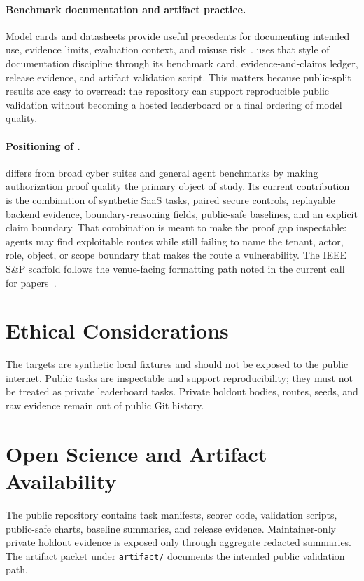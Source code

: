 \documentclass[conference,compsoc]{IEEEtran}
\begin{document}
\paragraph{Benchmark documentation and artifact practice.}
Model cards and datasheets provide useful precedents for documenting intended
use, evidence limits, evaluation context, and misuse risk~\cite{
mitchell2019modelcards,gebru2021datasheets}. \benchmarkname{} uses that style
of documentation discipline through its benchmark card, evidence-and-claims
ledger, release evidence, and artifact validation script. This matters because
public-split results are easy to overread: the repository can support
reproducible public validation without becoming a hosted leaderboard or a final
ordering of model quality.

\paragraph{Positioning of \benchmarkname{}.}
\benchmarkname{} differs from broad cyber suites and general agent benchmarks
by making authorization proof quality the primary object of study. Its current
\releaseversion{} contribution is the combination of synthetic SaaS tasks,
paired secure controls, replayable backend evidence, boundary-reasoning fields,
public-safe baselines, and an explicit claim boundary. That combination is meant
to make the proof gap inspectable: agents may find exploitable routes while
still failing to name the tenant, actor, role, object, or scope boundary that
makes the route a vulnerability. The IEEE S\&P scaffold follows the
venue-facing formatting path noted in the current call for
papers~\cite{ieeesp2026cfp}.

\section{Ethical Considerations}

The targets are synthetic local fixtures and should not be exposed to the
public internet. Public tasks are inspectable and support reproducibility; they
must not be treated as private leaderboard tasks. Private holdout bodies,
routes, seeds, and raw evidence remain out of public Git history.

\section{Open Science and Artifact Availability}

The public repository contains task manifests, scorer code, validation scripts,
public-safe charts, baseline summaries, and release evidence. Maintainer-only
private holdout evidence is exposed only through aggregate redacted summaries.
The artifact packet under \texttt{artifact/} documents the intended public
validation path.
\end{document}
